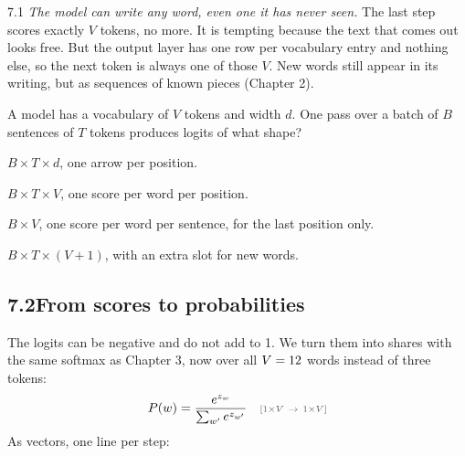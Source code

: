 \begin{wrongidea}{7.1}
\emph{The model can write any word, even one it has never seen.} The last step scores exactly $V$ tokens, no more.
It is tempting because the text that comes out looks free. But the output layer has one row per vocabulary entry
and nothing else, so the next token is always one of those $V$. New words still appear in its writing, but as sequences of known pieces (Chapter 2).
\end{wrongidea}

\begin{checkq}
A model has a vocabulary of $V$ tokens and width $d$. One pass over a batch of $B$ sentences of $T$ tokens
produces logits of what shape?
\begin{options}
\item $B\times T\times d$, one arrow per position.
\item $B\times T\times V$, one score per word per position.
\item $B\times V$, one score per word per sentence, for the last position only.
\item $B\times T\times (V+1)$, with an extra slot for new words.
\end{options}
\end{checkq}


\subsection*{7.2\quad From scores to probabilities}

The logits can be negative and do not add to 1. We turn them into shares with the same softmax as Chapter 3,
now over all $V=12$ words instead of three tokens:
\[
P(w) = \frac{e^{z_w}}{\sum_{w'} e^{z_{w'}}} \shape{1\times V\ \to\ 1\times V}
\]
As vectors, one line per step:

\par\medskip\noindent\begin{minipage}{\linewidth}\centering

\end{minipage}\par\medskip

